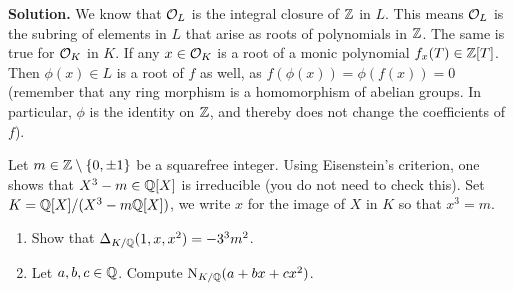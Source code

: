 \documentclass[a4paper,11pt]{article}
\begin{document}
\textbf{Solution.} We know that $\mathcal{O}_L$ is the integral closure of $\mathbb{Z}$ in $L$. This
means $\mathcal{O}_L$ is the subring of elements in $L$ that arise as roots of polynomials
in $\mathbb{Z}$. The same is true for $\mathcal{O}_K$ in $K$. If any $x \in \mathcal{O}_K$ is a root of a
monic polynomial $f_x(T) \in \mathbb{Z}[T]$. Then $\phi(x) \in L$ is a root of $f$ as well,
as $f(\phi(x)) = \phi(f(x)) = 0$ (remember that any ring morphism is a
homomorphism of abelian groups. In particular, $\phi$ is the identity
on $\mathbb{Z}$, and thereby does not change the coefficients of $f$).

Let $m \in \mathbb{Z} \setminus \{0, \pm 1\}$ be a squarefree integer. Using Eisenstein's
criterion, one shows that $X^3 -m \in \mathbb{Q}[X]$ is irreducible (you do not need to check
this). Set $K = \mathbb{Q}[X]/(X^3-m \mathbb{Q}[X])$, we write $x$ for the image of $X$ in $K$
so that $x^3 = m$. 
\begin{enumerate}
    \item Show that $\Delta_{K/\mathbb{Q}}(1,x,x^2) = -3^3 m^2$.
    \item Let $a,b,c \in \mathbb{Q}$. Compute $\operatorname{N}_{K/\mathbb{Q}}(a + bx + cx^2)$.
\end{enumerate}
\end{document}

